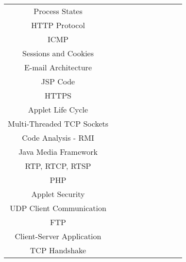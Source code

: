\documentclass[a4paper]{article}
\begin{document}
\begin{table}[h]
\begin{tabular}{|c||c|c||c|c||c||c|c||c|c||}
			Process States & & & & & & & \checkmark & & \\
			HTTP Protocol & & & & & & & \checkmark & & \\
			ICMP & & & & & & & \checkmark & \checkmark & \\
			Sessions and Cookies & & & & & & & \checkmark & &
			\checkmark \\
			E-mail Architecture & & & & & & & & \checkmark & \\
			JSP Code & & & & & & & & \checkmark & \checkmark \\
			HTTPS & & & & & & & & \checkmark & \\
			Applet Life Cycle & & & & & & & & \checkmark & \\
			Multi-Threaded TCP Sockets & & & & & & & & \checkmark & \\
			Code Analysis - RMI & & & & & & & & \checkmark & \\
			Java Media Framework & & & & & & & & \checkmark & \\
			RTP, RTCP, RTSP & & & & & & & & & \checkmark \\
			PHP & & & & & & & & & \checkmark \\
			Applet Security & & & & & & & & & \checkmark \\
			UDP Client Communication & & & & & & & & & \checkmark \\
			FTP & & & & & & & & & \checkmark \\
			Client-Server Application & & & & & & & & & \checkmark
			\\
			TCP Handshake & & & & & & & & & \checkmark \\
			\hline
			\hline
		\end{tabular}
	\end{table}
\end{document}
